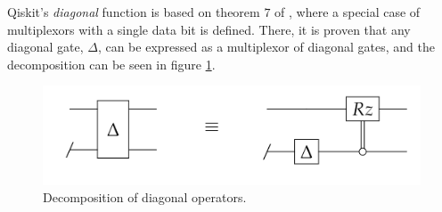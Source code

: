 \documentclass[../../../dissertation.tex]{subfiles}
\begin{document}
Qiskit's \textit{diagonal} function is based on theorem $7$ of \cite{shende06},
where a special case of multiplexors with a single data bit is defined. There,
it is proven that any diagonal gate, $\Delta$, can be expressed as a
multiplexor of diagonal gates, and the decomposition can be seen in figure
\ref{fig:shendeDiagDecomp}. 
\begin{figure}[!h]
	\centering
	\includegraphics[scale=0.35]{img/QCircuit/diagonal/qcDelta.png}
	\caption{Decomposition of diagonal operators.} 
	\label{fig:shendeDiagDecomp}
\end{figure}\par
\end{document}
